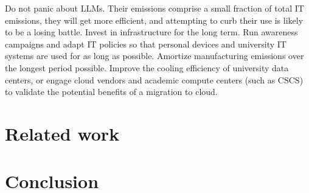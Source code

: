 \documentclass[11pt]{article}
\begin{document}
Do not panic about LLMs. Their emissions comprise a small fraction of total IT emissions, they will get more efficient, and attempting to curb their use is likely to be a losing battle.
Invest in infrastructure for the long term. Run awareness campaigns and adapt IT policies so that personal devices and university IT systems are used for as long as possible. Amortize manufacturing emissions over the longest period possible.
Improve the cooling efficiency of university data centers, or engage cloud vendors and academic compute centers (such as CSCS) to validate the potential benefits of a migration to cloud.



\section{Related work}
\label{sec:related:work}



\section{Conclusion}

\printbibliography
\end{document}
